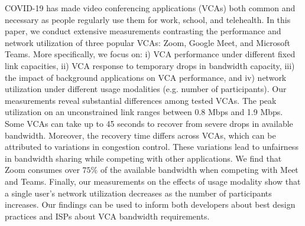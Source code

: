 {COVID-19 has made video conferencing applications (VCAs) both common and necessary as people regularly use them for work, school, and telehealth. In this paper, we conduct extensive measurements contrasting the performance and network utilization of three popular VCAs: Zoom, Google Meet, and Microsoft Teams. More specifically, we focus on: i) VCA performance under different fixed link capacities, ii) VCA response to temporary drops in bandwidth capacity, iii) the impact of background applications on VCA performance, and iv) network utilization under different usage modalities (e.g. number of participants). Our measurements reveal substantial differences among tested VCAs. The peak utilization on an unconstrained link ranges between 0.8 Mbps and 1.9 Mbps. Some VCAs can take up to 45 seconds to recover from severe drops in available bandwidth. Moreover, the recovery time differs across VCAs, which can be attributed to variations in congestion control. These variations lead to unfairness in bandwidth sharing while competing with other applications. We find that Zoom consumes over $75\%$ of the available bandwidth when competing with Meet and Teams.
Finally, our measurements on the effects of usage modality show that a single user's network utilization decreases as the number of participants increases. Our findings can be used to inform both developers about best design practices and ISPs about VCA bandwidth requirements.




}


